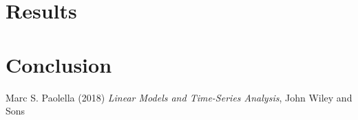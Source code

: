 \documentclass[12pt, a4paper]{article}%
\begin{document}
\section{Results}


\section{Conclusion} 



\begin{thebibliography}{1}

Marc S. Paolella (2018) \emph{Linear Models and Time-Series Analysis}, John Wiley and Sons

\end{thebibliography}
\end{document}

